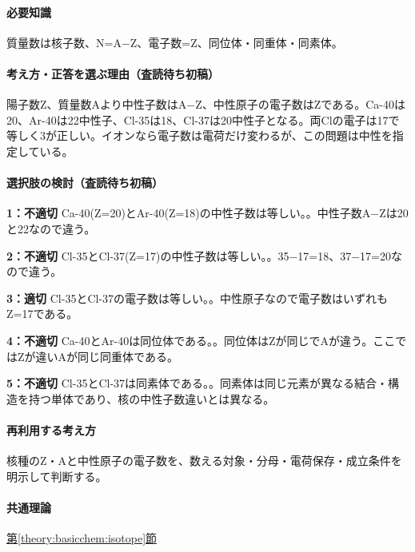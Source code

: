\paragraph{必要知識} 質量数は核子数、N=\allowbreak{}A−Z、電子数=Z、同位体・同重体・同素体。

\paragraph{考え方・正答を選ぶ理由（査読待ち初稿）} 陽子数Z、質量数Aより中性子数はA−Z、中性原子の電子数はZである。Ca-40は20、Ar-40は22中性子、Cl-35は18、Cl-37は20中性子となる。両Clの電子は17で等しく3が正しい。イオンなら電子数は電荷だけ変わるが、この問題は中性を指定している。

\paragraph{選択肢の検討（査読待ち初稿）}\mbox{}\par

\noindent\textbf{1：不適切} Ca-40(Z=\allowbreak{}20)とAr-40(Z=\allowbreak{}18)の中性子数は等しい。。中性子数A−Zは20と22なので違う。\par

\noindent\textbf{2：不適切} Cl-35とCl-37(Z=\allowbreak{}17)の中性子数は等しい。。35−17=\allowbreak{}18、37−17=\allowbreak{}20なので違う。\par

\noindent\textbf{3：適切} Cl-35とCl-37の電子数は等しい。。中性原子なので電子数はいずれもZ=\allowbreak{}17である。\par

\noindent\textbf{4：不適切} Ca-40とAr-40は同位体である。。同位体はZが同じでAが違う。ここではZが違いAが同じ同重体である。\par

\noindent\textbf{5：不適切} Cl-35とCl-37は同素体である。。同素体は同じ元素が異なる結合・構造を持つ単体であり、核の中性子数違いとは異なる。\par

\paragraph{再利用する考え方} 核種のZ・Aと中性原子の電子数を、数える対象・分母・電荷保存・成立条件を明示して判断する。

\paragraph{共通理論} \hyperref[theory:basicchem:isotope]{第\ref*{theory:basicchem:isotope}節}

